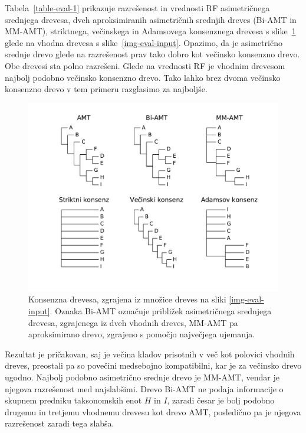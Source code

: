 \documentclass[a4paper, 12pt]{book}
\begin{document}
\noindent Tabela~\ref{table-eval-1} prikazuje razrešenost in vrednosti RF asimetričnega
srednjega drevesa, dveh aproksimiranih asimetričnih srednjih dreves 
(Bi-AMT in MM-AMT), striktnega, večinskega in Adamsovega konsenznega drevesa s 
slike~\ref{img-eval-result} glede na vhodna drevesa s slike~\ref{img-eval-input}. 
Opazimo, da je asimetrično srednje drevo glede na razrešenost prav tako dobro 
kot večinsko konsenzno drevo. Obe drevesi sta polno razrešeni. Glede na
vrednosti RF je vhodnim drevesom najbolj podobno večinsko konsenzno drevo. 
Tako lahko brez dvoma večinsko konsenzno drevo v tem primeru razglasimo za 
najboljše.

\begin{figure}[h!]
	\begin{center}
		\includegraphics[scale=0.55, clip=true, trim=1.5cm 1.5cm 1cm 0.8cm]{gfx/eval_gfx.pdf}
	\end{center}
	\caption{
	         Konsenzna drevesa, zgrajena iz množice dreves na sliki \ref{img-eval-input}. Oznaka Bi-AMT označuje 
	         približek asimetričnega srednjega drevesa, zgrajenega iz dveh vhodnih dreves, MM-AMT pa aproksimirano 
	         drevo, zgrajeno s pomočjo največjega ujemanja.
	    }
	\label{img-eval-result}
\end{figure}

Rezultat je pričakovan, saj je večina kladov prisotnih v več kot polovici vhodnih 
dreves, preostali pa so povečini medsebojno kompatibilni, kar je za večinsko drevo
ugodno. Najbolj podobno asimetrično srednje drevo je MM-AMT, vendar je njegova 
razrešenost med najslabšimi. Drevo Bi-AMT ne podaja informacije o skupnem predniku 
taksonomskih enot $H$ in $I$, zaradi česar je bolj podobno drugemu in tretjemu 
vhodnemu drevesu kot drevo AMT, posledično pa je njegova razrešenost zaradi tega slabša. 
\end{document}
